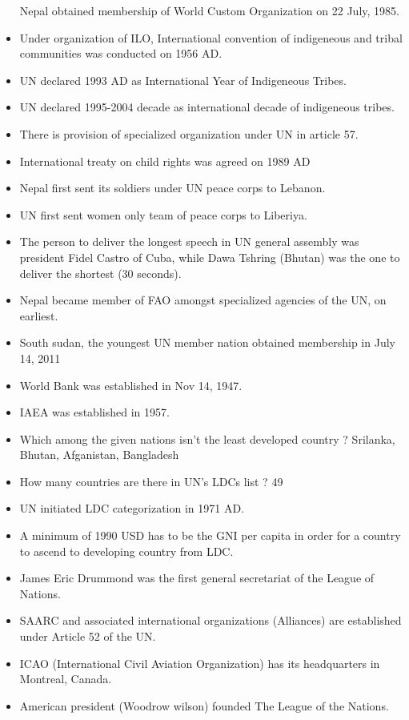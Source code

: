 \documentclass[
  openany]{book}
\begin{document}
\begin{itemize}
  Nepal obtained membership of World Custom Organization on 22 July, 1985.
\item
  Under organization of ILO, International convention of indigeneous and tribal communities was conducted on 1956 AD.
\item
  UN declared 1993 AD as International Year of Indigeneous Tribes.
\item
  UN declared 1995-2004 decade as international decade of indigeneous tribes.
\item
  There is provision of specialized organization under UN in article 57.
\item
  International treaty on child rights was agreed on 1989 AD
\item
  Nepal first sent its soldiers under UN peace corps to Lebanon.
\item
  UN first sent women only team of peace corps to Liberiya.
\item
  The person to deliver the longest speech in UN general assembly was president Fidel Castro of Cuba, while Dawa Tshring (Bhutan) was the one to deliver the shortest (30 seconds).
\item
  Nepal became member of FAO amongst specialized agencies of the UN, on earliest.
\item
  South sudan, the youngest UN member nation obtained membership in July 14, 2011
\item
  World Bank was established in Nov 14, 1947.
\item
  IAEA was established in 1957.
\item
  Which among the given nations isn't the least developed country ? Srilanka, Bhutan, Afganistan, Bangladesh
\item
  How many countries are there in UN's LDCs list ? 49
\item
  UN initiated LDC categorization in 1971 AD.
\item
  A minimum of 1990 USD has to be the GNI per capita in order for a country to ascend to developing country from LDC.
\item
  James Eric Drummond was the first general secretariat of the League of Nations.
\item
  SAARC and associated international organizations (Alliances) are established under Article 52 of the UN.
\item
  ICAO (International Civil Aviation Organization) has its headquarters in Montreal, Canada.
\item
  American president (Woodrow wilson) founded The League of the Nations.

\end{itemize}
\end{document}
